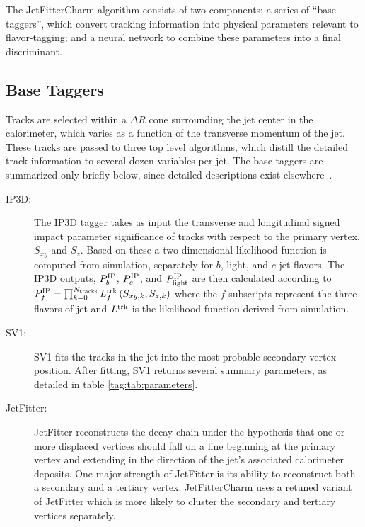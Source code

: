 The JetFitterCharm algorithm consists of two components: a series of ``base taggers'', which convert tracking information into physical parameters relevant to flavor{}-tagging; and a neural network to combine these parameters into a final discriminant.


\subsection{Base Taggers}

Tracks are selected within a
$\Delta R$ cone surrounding the jet center in the calorimeter, which varies as a function of the transverse momentum of the jet. These tracks are passed to three
top level algorithms, which distill the detailed track information
to several dozen variables per jet. The base taggers are summarized only briefly below, since detailed descriptions exist elsewhere~\cite{AdvancedTaggers}.%
\begin{description}
  \item[IP3D:] The IP3D tagger takes as input the transverse and longitudinal
    signed impact parameter significance of tracks with respect to the primary vertex,
    $S_{xy}$ and $S_{z}$.
    Based on these a two-dimensional likelihood function is computed from simulation, separately for $b$, light, and $c$-jet flavors.
    The IP3D outputs,
    $P_{b}^{\rm IP}$, $P_{c}^{\rm IP}$, and $P_{\rm light}^{\rm IP}$ are then calculated according to
     $P_f^{\rm IP} = \prod_{k=0}^{N_{\rm{tracks}}} L_f^{\rm trk} \left(S_{xy, k},S_{z, k}\right)$
    where the $f$ subscripts represent the three flavors of jet and $L^{\rm trk}$ is the
    likelihood function derived from simulation.
  \item[SV1:] SV1 fits the tracks in the jet into the most probable secondary
    vertex position. After fitting, SV1 returns several summary parameters, as detailed in table \ref{tag:tab:parameters}.
  \item[JetFitter:] JetFitter reconstructs the decay chain under the hypothesis
    that one or more displaced vertices should fall on a line beginning at the
    primary vertex and extending in the direction of the jet's associated
    calorimeter deposits. One major strength of JetFitter is its
    ability to reconstruct both a secondary and a tertiary
    vertex. JetFitterCharm uses a retuned variant of JetFitter which
    is more likely to cluster the secondary and tertiary vertices
    separately.
\end{description}


